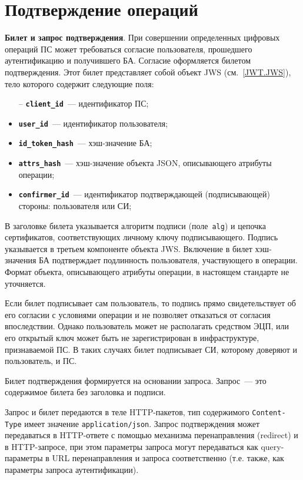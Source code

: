 \section{Подтверждение операций}\label{OIDC.Confirm}

{\bf Билет и запрос подтверждения}.
%
При совершении определенных цифровых операций ПС может требоваться
согласие пользователя, прошедшего аутентификацию и получившего БА. 
Согласие оформляется билетом подтверждения. Этот билет представляет собой 
объект JWS (см.~\ref{JWT.JWS}), тело которого содержит следующие поля: 
\begin{itemize}
\item[--] 
{\bf \lstinline{client_id}}~--- идентификатор ПС;

\item[--] 
{\bf \lstinline{user_id}}~--- идентификатор пользователя;

\item[--] 
{\bf \lstinline{id_token_hash}}~--- хэш-значение БА;

\item[--] 
{\bf \lstinline{attrs_hash}}~--- хэш-значение объекта JSON,
описывающего атрибуты операции; 

\item[--] 
{\bf \lstinline{confirmer_id}}~--- идентификатор
подтверждающей (подписывающей) стороны: пользователя или СИ;
\end{itemize}

В заголовке билета указывается алгоритм подписи (поле~\lstinline{alg})
и цепочка сертификатов, соответствующих личному ключу подписывающего.
Подпись указывается в третьем компоненте объекта JWS.
%
Включение в билет хэш-значения БА подтверждает подлинность 
пользователя, участвующего в операции.
%
Формат объекта, описывающего атрибуты операции, в настоящем стандарте не 
уточняется.

Если билет подписывает сам пользователь, 
то подпись прямо свидетельствует об его согласии с условиями
операции и не позволяет отказаться от согласия впоследствии.
%
Однако пользователь может не располагать средством ЭЦП, или его 
открытый ключ может быть не зарегистрирован в инфраструктуре,
признаваемой ПС. В таких случаях билет подписывает СИ,
которому доверяют и пользователь, и ПС. 

Билет подтверждения формируется на основании запроса.
Запрос~--- это содержимое билета без заголовка и подписи. 

Запрос и билет передаются в теле
HTTP-пакетов, тип содержимого \lstinline{Content-Type}
имеет значение \lstinline{application/json}.
Запрос подтверждения может передаваться
в HTTP-ответе с помощью механизма перенаправления (redirect) и
в HTTP-запросе, при этом параметры запроса могут
передаваться как query-параметры в URL перенаправления и запроса соответственно
(т.е. также, как параметры запроса аутентификации).

